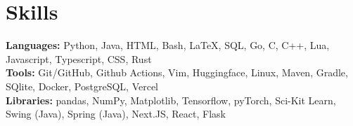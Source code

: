 \documentclass{article}
\begin{document}
\vspace{-10pt}


\section{Skills}
\begin{itemize}[leftmargin=0.15in, label={}]
	\small{\item{

		            \textbf{Languages:}{ Python, Java, HTML, Bash, \LaTeX, SQL, Go, C, C++, Lua, Javascript, Typescript, CSS, Rust} \\

		            \textbf{Tools:}{ Git/GitHub, Github Actions, Vim, Huggingface, Linux, Maven, Gradle, SQlite, Docker, PostgreSQL, Vercel}\\
		            \textbf{Libraries:}{ pandas, NumPy, Matplotlib, Tensorflow, pyTorch, Sci-Kit Learn, Swing (Java), Spring (Java), Next.JS, React, Flask}

		      }}
\end{itemize}
\vspace{-10pt}


\end{document}
